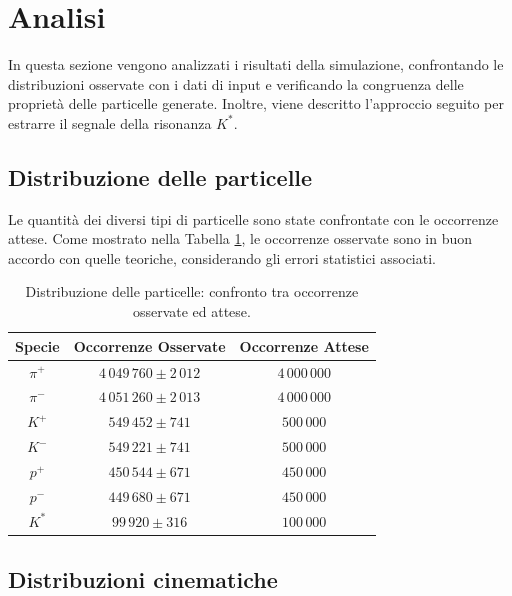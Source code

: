 \documentclass[a4paper,11pt]{article}
\begin{document}
\clearpage

\section{Analisi}

In questa sezione vengono analizzati i risultati della simulazione, confrontando le distribuzioni osservate con i dati di input e verificando la congruenza delle proprietà delle particelle generate. Inoltre, viene descritto l'approccio seguito per estrarre il segnale della risonanza \( K^* \).

\subsection{Distribuzione delle particelle}

Le quantità dei diversi tipi di particelle sono state confrontate con le occorrenze attese. Come mostrato nella Tabella \ref{tab:abbondanze}, le occorrenze osservate sono in buon accordo con quelle teoriche, considerando gli errori statistici associati.

\begin{table}[h!]
    \centering
    \begin{tabular}{|c|c|c|}
        \hline
        \textbf{Specie} & \textbf{Occorrenze Osservate} & \textbf{Occorrenze Attese} \\
        \hline
        $\pi^+$ & $4\,049\,760 \pm 2\,012$ & $4\,000\,000$ \\
        \hline
        $\pi^-$ & $4\,051\,260 \pm 2\,013$ & $4\,000\,000$ \\
        \hline
        $K^+$ & $549\,452 \pm 741$ & $500\,000$ \\
        \hline
        $K^-$ & $549\,221 \pm 741$ & $500\,000$ \\
        \hline
        $p^+$ & $450\,544 \pm 671$ & $450\,000$ \\
        \hline
        $p^-$ & $449\,680 \pm 671$ & $450\,000$ \\
        \hline
        $K^*$ & $99\,920 \pm 316$ & $100\,000$ \\
        \hline
    \end{tabular}
    \caption{Distribuzione delle particelle: confronto tra occorrenze osservate ed attese.}
    \label{tab:abbondanze}
\end{table}

\subsection{Distribuzioni cinematiche}
\end{document}
